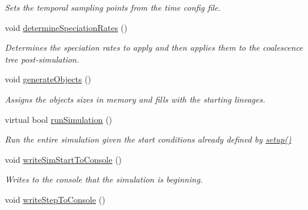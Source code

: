 \begin{DoxyCompactItemize}
\begin{DoxyCompactList}\small\item\em Sets the temporal sampling points from the time config file. \end{DoxyCompactList}\item 
void \hyperlink{class_tree_a25f082da13789dfa3fefcbcfd08b4dfe}{determine\+Speciation\+Rates} ()
\begin{DoxyCompactList}\small\item\em Determines the speciation rates to apply and then applies them to the coalescence tree post-\/simulation. \end{DoxyCompactList}\item 
void \hyperlink{class_tree_a50b3d13d4032e0d7a69890b9bd7f84fa}{generate\+Objects} ()\hypertarget{class_tree_a50b3d13d4032e0d7a69890b9bd7f84fa}{}\label{class_tree_a50b3d13d4032e0d7a69890b9bd7f84fa}

\begin{DoxyCompactList}\small\item\em Assigns the objects sizes in memory and fills with the starting lineages. \end{DoxyCompactList}\item 
virtual bool \hyperlink{class_tree_afe75245862a1c40030c1c8607518cf8d}{run\+Simulation} ()
\begin{DoxyCompactList}\small\item\em Run the entire simulation given the start conditions already defined by \hyperlink{class_tree_aec10ea2b720edc13a38310afdfe2b6e4}{setup()} \end{DoxyCompactList}\item 
void \hyperlink{class_tree_a95360a2f62ef0eb436d586552b299e1f}{write\+Sim\+Start\+To\+Console} ()\hypertarget{class_tree_a95360a2f62ef0eb436d586552b299e1f}{}\label{class_tree_a95360a2f62ef0eb436d586552b299e1f}

\begin{DoxyCompactList}\small\item\em Writes to the console that the simulation is beginning. \end{DoxyCompactList}\item 
void \hyperlink{class_tree_a37de93174eece50a2fc082b683d97047}{write\+Step\+To\+Console} ()\hypertarget{class_tree_a37de93174eece50a2fc082b683d97047}{}\label{class_tree_a37de93174eece50a2fc082b683d97047}


\end{DoxyCompactItemize}
